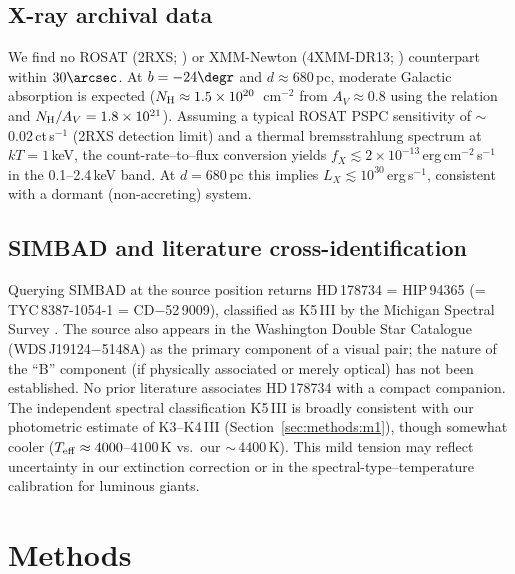 \documentclass[usenatbib,fleqn]{mnras}
\begin{document}
\subsection{X-ray archival data}
\label{sec:data:xray}

We find no ROSAT (2RXS; \citealt{Boller2016}) or XMM-Newton
(4XMM-DR13; \citealt{Webb2020}) counterpart within $30\arcsec$.
At $b = -24\degr$ and $d \approx 680$\,pc, moderate Galactic
absorption is expected ($N_{\rm H} \approx 1.5 \times 10^{20}$\,
cm$^{-2}$ from $A_V \approx 0.8$ using the \citealt{Cardelli1989}
relation and $N_{\rm H}/A_V = 1.8 \times 10^{21}$).
Assuming a typical ROSAT PSPC sensitivity of
$\sim$\,$0.02$\,ct\,s$^{-1}$ (2RXS detection limit) and a thermal
bremsstrahlung spectrum at $kT = 1$\,keV, the count-rate--to--flux
conversion yields
$f_X \lesssim 2 \times 10^{-13}$\,erg\,cm$^{-2}$\,s$^{-1}$ in
the 0.1--2.4\,keV band.  At $d = 680$\,pc this implies
$L_X \lesssim 10^{30}$\,erg\,s$^{-1}$, consistent with a dormant
(non-accreting) system.

\subsection{SIMBAD and literature cross-identification}
\label{sec:data:simbad}

Querying SIMBAD \citep{Wenger2000} at the source position returns
HD\,178734 = HIP\,94365 (= TYC\,8387-1054-1 = CD$-$52\,9009),
classified as K5\,III by the Michigan Spectral Survey
\citep[quality flag C;][]{Houk1978}.  The source also appears in
the Washington Double Star Catalogue (WDS\,J19124$-$5148A) as the
primary component of a visual pair; the nature of the ``B''
component (if physically associated or merely optical) has not
been established.  No prior literature associates HD\,178734
with a compact companion.  The independent spectral classification
K5\,III is broadly consistent with our photometric estimate
of K3--K4\,III (Section~\ref{sec:methods:m1}), though somewhat
cooler ($T_{\rm eff} \approx 4000$--$4100$\,K vs.~our
$\sim$\,$4400$\,K).  This mild tension may reflect uncertainty in
our extinction correction or in the spectral-type--temperature
calibration for luminous giants.

\section{Methods}
\label{sec:methods}
\end{document}
